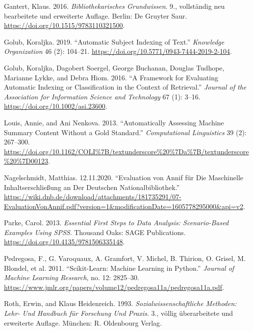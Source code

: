 \hypertarget{refs}{}
\begin{CSLReferences}{1}{0}
\leavevmode\hypertarget{ref-Gantert.2016}{}%
Gantert, Klaus. 2016. \emph{Bibliothekarisches Grundwissen}. 9.,
vollst{ä}ndig neu bearbeitete und erweiterte Auflage. Berlin: {De
Gruyter Saur}. \url{https://doi.org/10.1515/9783110321500}.

\leavevmode\hypertarget{ref-Golub.2019}{}%
Golub, Koraljka. 2019. {``Automatic Subject Indexing of Text.''}
\emph{Knowledge Organization} 46 (2): 104--21.
\url{https://doi.org/10.5771/0943-7444-2019-2-104}.

\leavevmode\hypertarget{ref-Golub.2016}{}%
Golub, Koraljka, Dagobert Soergel, George Buchanan, Douglas Tudhope,
Marianne Lykke, and Debra Hiom. 2016. {``A Framework for Evaluating
Automatic Indexing or Classification in the Context of Retrieval.''}
\emph{Journal of the Association for Information Science and Technology}
67 (1): 3--16. \url{https://doi.org/10.1002/asi.23600}.

\leavevmode\hypertarget{ref-Louis.2013}{}%
Louis, Annie, and Ani Nenkova. 2013. {``Automatically Assessing Machine
Summary Content Without a Gold Standard.''} \emph{Computational
Linguistics} 39 (2): 267--300.
\url{https://doi.org/10.1162/COLI\%7B/textunderscore\%20\%7Da\%7B/textunderscore\%20\%7D00123}.

\leavevmode\hypertarget{ref-Nagelschmidt.12.11.2020}{}%
Nagelschmidt, Matthias. 12.11.2020. {``Evaluation von Annif f{ü}r Die
Maschinelle Inhaltserschlie{ß}ung an Der Deutschen
Nationalbibliothek.''}
\url{https://wiki.dnb.de/download/attachments/181735291/07-EvaluationVonAnnif.pdf?version=1\&modificationDate=1605778295000\&api=v2}.

\leavevmode\hypertarget{ref-Parke.2013}{}%
Parke, Carol. 2013. \emph{Essential First Steps to Data Analysis:
Scenario-Based Examples Using SPSS}. Thousand Oaks: {SAGE Publications}.
\url{https://doi.org/10.4135/9781506335148}.

\leavevmode\hypertarget{ref-Pedregosa.2011}{}%
Pedregosa, F., G. Varoquaux, A. Gramfort, V. Michel, B. Thirion, O.
Grisel, M. Blondel, et al. 2011. {``Scikit-Learn: Machine Learning in
Python.''} \emph{Journal of Machine Learning Research}, no. 12:
2825--30.
\url{https://www.jmlr.org/papers/volume12/pedregosa11a/pedregosa11a.pdf}.

\leavevmode\hypertarget{ref-Roth.1993}{}%
Roth, Erwin, and Klaus Heidenreich. 1993. \emph{Sozialwissenschaftliche
Methoden: Lehr- Und Handbuch f{ü}r Forschung Und Praxis}. 3., v{ö}llig
{ü}berarbeitete und erweiterte Auflage. M{ü}nchen: {R. Oldenbourg
Verlag}.


\end{CSLReferences}
